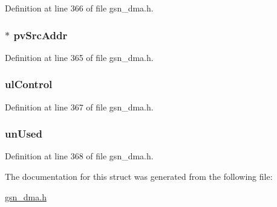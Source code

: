 Definition at line 366 of file gsn\_\-dma.h.

\hypertarget{a00050_a369c025bb6fdbac8a9c503cb2ae90d5b}{
\subsubsection[{pvSrcAddr}]{$\ast$ {\bf pvSrcAddr}}}
\label{a00050_a369c025bb6fdbac8a9c503cb2ae90d5b}


Definition at line 365 of file gsn\_\-dma.h.

\hypertarget{a00050_a5010fc8f1769629024680e6365279fab}{
\subsubsection[{ulControl}]{ {\bf ulControl}}}
\label{a00050_a5010fc8f1769629024680e6365279fab}


Definition at line 367 of file gsn\_\-dma.h.

\hypertarget{a00050_adf9df21c87565bcf3fd5f636086eff39}{
\subsubsection[{unUsed}]{ {\bf unUsed}}}
\label{a00050_adf9df21c87565bcf3fd5f636086eff39}


Definition at line 368 of file gsn\_\-dma.h.



The documentation for this struct was generated from the following file:\begin{DoxyCompactItemize}
\item 
\hyperlink{a00484}{gsn\_\-dma.h}\end{DoxyCompactItemize}
